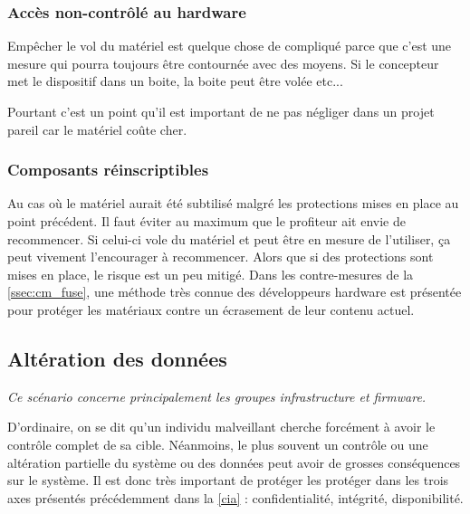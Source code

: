 \documentclass[12pt]{article}
\begin{document}
\subsubsection{Accès non-contrôlé au hardware}

Empêcher le vol du matériel est quelque chose de compliqué parce que c'est une mesure qui pourra toujours être contournée avec des moyens. Si le concepteur met le dispositif dans un boite, la boite peut être volée etc... 

Pourtant c'est un point qu'il est important de ne pas négliger dans un projet pareil car le matériel coûte cher.

\subsubsection{Composants réinscriptibles}

Au cas où le matériel aurait été subtilisé malgré les protections mises en place au point précédent. Il faut éviter au maximum que le profiteur ait envie de recommencer. Si celui-ci vole du matériel et peut être en mesure de l'utiliser, ça peut vivement l'encourager à recommencer. Alors que si des protections sont mises en place, le risque est un peu mitigé. Dans les contre-mesures de la \autoref{ssec:cm_fuse}, une méthode très connue des développeurs hardware est présentée pour protéger les matériaux contre un écrasement de leur contenu actuel.
\clearpage


\subsection{Altération des données}

\emph{Ce scénario concerne principalement les groupes infrastructure et firmware.}
\medskip

D'ordinaire, on se dit qu'un individu malveillant cherche forcément à avoir le contrôle complet de sa cible. Néanmoins, le plus souvent un contrôle ou une altération partielle du système ou des données peut avoir de grosses conséquences sur le système. Il est donc très important de protéger les protéger dans les trois axes présentés précédemment dans la \autoref{cia} : confidentialité, intégrité, disponibilité.
\medskip
\end{document}
